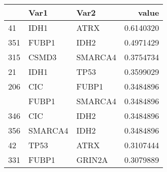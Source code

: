 \documentclass[border=1mm]{standalone}
\begin{document}
\begin{tabular}{lllr}
\toprule
  & Var1 & Var2 & value\\
\midrule
41 & IDH1 & ATRX & 0.6140320\\
351 & FUBP1 & IDH2 & 0.4971429\\
315 & CSMD3 & SMARCA4 & 0.3754734\\
21 & IDH1 & TP53 & 0.3599029\\
206 & CIC & FUBP1 & 0.3484896\\
\addlinespace
311 & FUBP1 & SMARCA4 & 0.3484896\\
346 & CIC & IDH2 & 0.3484896\\
356 & SMARCA4 & IDH2 & 0.3484896\\
42 & TP53 & ATRX & 0.3107444\\
331 & FUBP1 & GRIN2A & 0.3079889\\
\bottomrule
\end{tabular}
\end{document}
